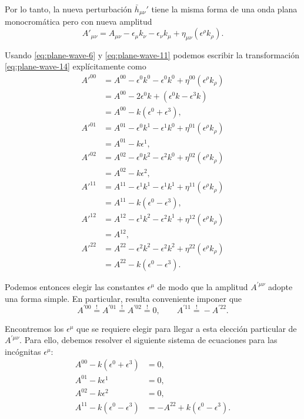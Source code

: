 \documentclass[letterpaper,11pt]{article}
\begin{document}
Por lo tanto, la nueva perturbación $\bar{h}_{\mu\nu}'$ tiene la misma forma de una onda plana monocromática pero con nueva amplitud
\begin{equation}
A'_{\mu\nu} = A_{\mu\nu} - \epsilon_{\mu} k_{\nu} - \epsilon_{\nu} k_{\mu} + \eta_{\mu\nu} (\epsilon^{\rho} k_{\rho}). \label{eq:plane-wave-14}
\end{equation}

Usando \eqref{eq:plane-wave-6} y \eqref{eq:plane-wave-11} podemos escribir la transformación \eqref{eq:plane-wave-14} explícitamente como
\begin{align}
A'^{00} &= A^{00} - \epsilon^{0} k^{0} - \epsilon^{0} k^{0} + \eta^{00} (\epsilon^{\rho} k_{\rho}) \nonumber \\
&= A^{00} - 2 \epsilon^{0} k  + (\epsilon^{0} k - \epsilon^{3} k) \nonumber \\
&= A^{00} - k (\epsilon^0 + \epsilon^3), \\
A'^{01} &= A^{01} - \epsilon^{0} k^{1} - \epsilon^{1} k^{0} + \eta^{01} (\epsilon^{\rho} k_{\rho}) \nonumber \\
&= A^{01} - k \epsilon^1, \\
A'^{02} &= A^{02} - \epsilon^{0} k^{2} - \epsilon^{2} k^{0} + \eta^{02} (\epsilon^{\rho} k_{\rho}) \nonumber \\
&= A^{02} - k \epsilon^2, \\
A'^{11} &= A^{11} - \epsilon^{1} k^{1} - \epsilon^{1} k^{1} + \eta^{11} (\epsilon^{\rho} k_{\rho}) \nonumber \\
&= A^{11} - k(\epsilon^0 - \epsilon^3), \\
A'^{12} &= A^{12} - \epsilon^{1} k^{2} - \epsilon^{2} k^{1} + \eta^{12} (\epsilon^{\rho} k_{\rho}) \nonumber \\
&= A^{12}, \\
A'^{22} &= A^{22} - \epsilon^{2} k^{2} - \epsilon^{2} k^{2} + \eta^{22} (\epsilon^{\rho} k_{\rho}) \nonumber \\
&= A^{22} - k(\epsilon^0 - \epsilon^3).
\end{align}

Podemos entonces elegir las constantes $\epsilon^{\mu}$ de modo que la amplitud $A^{'\mu\nu}$ adopte una forma simple. En particular, resulta conveniente imponer que 
\begin{equation}
A^{'00} \stackrel{!}{=} A^{'01} \stackrel{!}{=} A^{'02} \stackrel{!}{=} 0,\qquad A^{'11} \stackrel{!}{=} - A^{'22}.
\end{equation}

Encontremos los $\epsilon^{\mu}$ que se requiere elegir para llegar a esta elección particular de $A^{'\mu\nu}$. Para ello, debemos resolver el siguiente sistema de ecuaciones para las incógnitas $\epsilon^{\mu}$:
\begin{align}
A^{00} - k(\epsilon^0 + \epsilon^3) &= 0, \label{eq:plane-wave-15}\\
A^{01} - k \epsilon^1 &= 0, \label{eq:plane-wave-16}\\
A^{02} - k\epsilon^2 &= 0, \label{eq:plane-wave-17}\\
A^{11} - k(\epsilon^0 - \epsilon^3) &= - A^{22} + k (\epsilon^0 - \epsilon^3). \label{eq:plane-wave-18}
\end{align}
\end{document}
